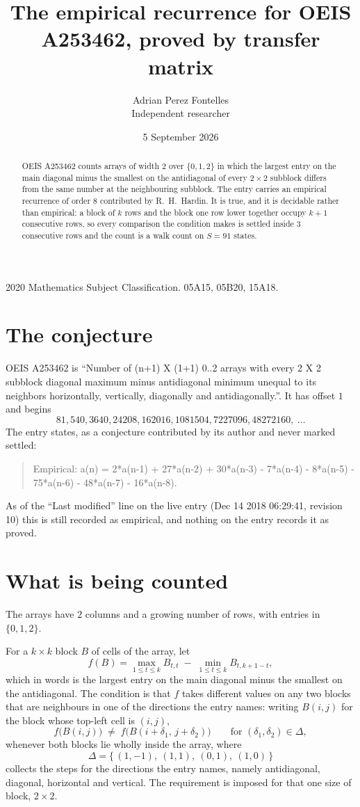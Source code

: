 \documentclass[11pt,a4paper]{article}
\title{The empirical recurrence for OEIS A253462, proved by transfer matrix}
\author{Adrian Perez Fontelles\\ \small Independent researcher}
\date{5 September 2026}
\theoremstyle{plain}
\theoremstyle{definition}
\begin{document}
\maketitle

\begin{abstract}
OEIS A253462 counts arrays of width $2$ over $\{0,1,2\}$ in which the largest entry on the main diagonal minus the smallest on the antidiagonal of every $2\times2$ subblock differs from the same number at the neighbouring subblock. The entry carries an
empirical recurrence of order $8$ contributed by R.~H.~Hardin. It is true, and it is
decidable rather than empirical: a block of $k$ rows and the block one row lower together
occupy $k+1$ consecutive rows, so every comparison the condition makes is settled inside
$3$ consecutive rows and the count is a walk count on $S=91$ states.
\end{abstract}

\noindent\small 2020 Mathematics Subject Classification. 05A15, 05B20, 15A18.\normalsize

\section{The conjecture}

OEIS A253462 is ``Number of (n+1) X (1+1) 0..2 arrays with every 2 X 2 subblock diagonal maximum minus antidiagonal minimum unequal to its neighbors horizontally, vertically, diagonally and antidiagonally.''. It has offset $1$ and begins
\[
81, 540, 3640, 24208, 162016, 1081504, 7227096, 48272160,\ \dots
\]
The entry states, as a conjecture contributed by its author and never marked settled:
\begin{quote}
Empirical: a(n) = 2*a(n-1) + 27*a(n-2) + 30*a(n-3) - 7*a(n-4) - 8*a(n-5) - 75*a(n-6) - 48*a(n-7) - 16*a(n-8).
\end{quote}
As of the ``Last modified'' line on the live entry (Dec 14 2018 06:29:41, revision 10) this is still
recorded as empirical, and nothing on the entry records it as proved.

\section{What is being counted}

The arrays have $2$ columns and a growing number of rows, with entries in $\{0,1,2\}$.

For a $k\times k$ block $B$ of cells of the array, let
\[
f(B)=\max_{1\le t\le k}B_{t,t}\;-\;\min_{1\le t\le k}B_{t,k+1-t} ,
\]
which in words is the largest entry on the main diagonal minus the smallest on the antidiagonal. The condition is that $f$ takes different values on any two blocks that
are neighbours in one of the directions the entry names: writing $B(i,j)$ for the block whose
top-left cell is $(i,j)$,
\[
f\bigl(B(i,j)\bigr)\;\neq\;f\bigl(B(i+\delta_1,\,j+\delta_2)\bigr)
\qquad\text{for }(\delta_1,\delta_2)\in\Delta,
\]
whenever both blocks lie wholly inside the array, where
\[
\Delta=\{\,(1,-1),\ (1,1),\ (0,1),\ (1,0)\,\}
\]
collects the steps for the directions the entry names, namely antidiagonal, diagonal, horizontal and vertical. The
requirement is imposed for that one size of block, $2\times2$.
\end{document}

